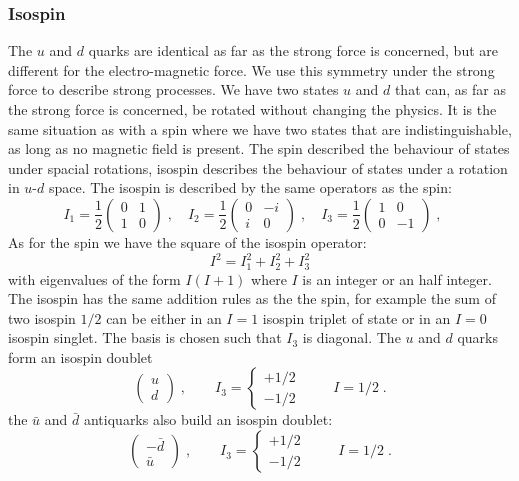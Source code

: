 \documentclass[12pt]{article}
\begin{document}
\subsubsection{Isospin}
The $u$ and $d$ quarks are identical as far as the strong force is concerned, but are different for the electro-magnetic force. We use this symmetry under the strong force to describe strong processes. We have two states $u$ and $d$ that can, as far as the strong force is concerned, be rotated without changing the physics. It is the same situation as with a spin where we have two states that are indistinguishable, as long as no magnetic field is present. The spin described the behaviour of states under spacial rotations, isospin describes the behaviour of states under a rotation in $u$-$d$ space. The isospin is described by the same operators as the spin:
\[
I_1=\frac{1}{2}\left(\begin{array}{cc}0&1\\1&0\end{array}\right)\;,\quad
I_2=\frac{1}{2}\left(\begin{array}{cc}0&-i\\i&0\end{array}\right)\;,\quad
I_3=\frac{1}{2}\left(\begin{array}{cc}1&0\\0&-1\end{array}\right)\;,\quad
\]
As for the spin we have the square of the isospin operator:
\[I^2=I_1^2+I_2^2+I_3^2\]
with eigenvalues of the form $I(I+1)$ where $I$ is an integer or an half integer. The isospin has the same addition rules as the the spin, for example the sum of two isospin $1/2$ can be either in an $I=1$ isospin triplet of state or in an $I=0$ isospin singlet. The basis is chosen such that $I_3$ is diagonal. The $u$ and $d$ quarks form an isospin doublet
\[\left(\begin{array}{c}u\\d\end{array}\right)\;,\qquad I_3 =\left\{\begin{array}{c}+1/2\\-1/2\end{array}\right.\;\qquad I=1/2\;.\]
the $\bar u$ and $\bar d$ antiquarks also build an isospin doublet:
\[\left(\begin{array}{c}-\bar d\\\bar u\end{array}\right)\;,\qquad I_3 =\left\{\begin{array}{c}+1/2\\-1/2\end{array}\right.\;\qquad I=1/2\;.\]
 
\end{document}
